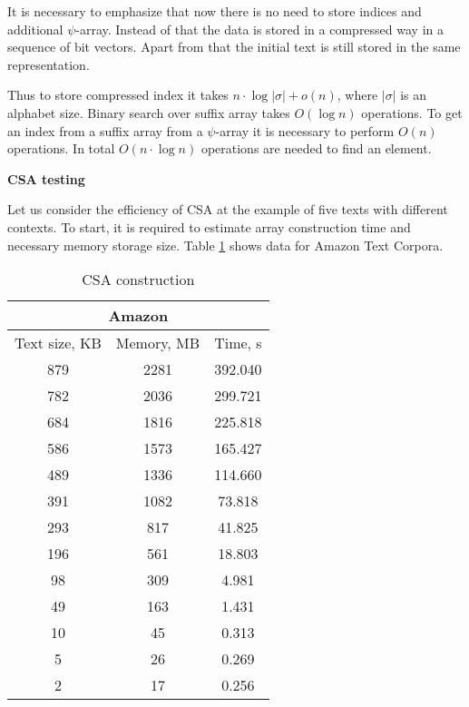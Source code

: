 It is necessary to emphasize that now there is no need to store indices and additional $\psi$-array.
Instead of that the data is stored in a compressed way in a sequence of bit vectors.
Apart from that the initial text is still stored in the same representation.

Thus to store compressed index it takes $n \cdot \log |\sigma| + o(n)$, where
$|\sigma|$ is an alphabet size. Binary search over suffix array takes $O(\log n)$ operations.
To get an index from a suffix array from a $\psi$-array it is necessary to perform $O(n)$ operations.
In total $O(n\cdot \log n)$ operations are needed to find an element.

\textbf{CSA testing}

Let us consider the efficiency of CSA at the example of five texts with different contexts.
To start, it is required to estimate array construction time and necessary memory storage size.
Table \ref{table:6} shows data for Amazon Text Corpora.


\begin{table}[h!]
	\centering
	\begin{tabular}{|c|c|c|}
		\hline
		\multicolumn{3}{|c|}{Amazon} \\
		\hline
		Text size, KB & Memory, MB & Time, s\\
		\hline
		879 & 2281 & 392.040\\
		\hline
		782 & 2036 & 299.721\\
		\hline
		684 & 1816 & 225.818\\
		\hline
		586 & 1573 & 165.427\\
		\hline
		489 & 1336 & 114.660\\
		\hline
		391 & 1082 & 73.818\\
		\hline
		293 & 817 & 41.825\\
		\hline
		196 & 561 & 18.803\\
		\hline
		98 & 309 & 4.981\\
		\hline
		49 & 163 & 1.431\\
		\hline
		10 & 45 & 0.313\\
		\hline
		5 & 26 & 0.269\\
		\hline
		2 & 17 & 0.256\\
		\hline
	\end{tabular}
	\caption{CSA construction}
	\label{table:6}
\end{table}


